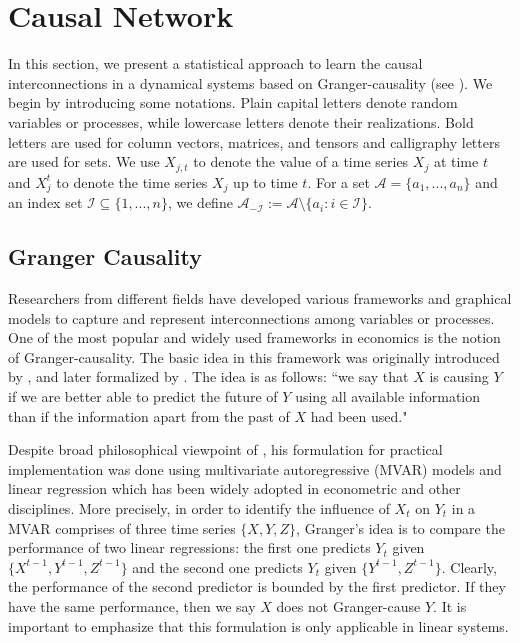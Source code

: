 

\section{Causal Network}\label{Sec1}

In this section, we present a statistical approach to learn the causal interconnections in a dynamical systems based on Granger-causality (see \citet{granger}). 
We begin by introducing some notations.
Plain capital letters denote random variables or processes, while lowercase letters denote their realizations. 
Bold letters are used for column vectors, matrices, and tensors and calligraphy letters are used for sets. 
We use $X_{j,t}$ to denote the value of a time series $X_j$ at time $t$ 
and $X^{t}_j$ to denote the time series $X_j$ up to time $t$. 
For a set $\mathcal{A}=\{a_1,...,a_n\}$ and an index set $\mathcal{I}\subseteq\{1,...,n\}$, we define $\mathcal{A}_{-\mathcal{I}}:=\mathcal{A}\setminus\{a_i: i\in\mathcal{I}\}$. 



\subsection{Granger Causality}\label{sec:granger}

Researchers from different fields have developed various frameworks and graphical models to capture and represent interconnections among variables or processes.
One of the most popular and widely used frameworks in economics is the notion of Granger-causality.
The basic idea in this framework was originally introduced by \citet{wiener1956theory}, and later formalized by \citet{granger}. 
The idea is as follows: ``we say that $X$ is causing $Y$ if we are better able to predict the future of $Y$ using all available information than if the information apart from the past of $X$ had been used."

Despite broad philosophical viewpoint of \citet{granger1963economic}, his formulation for practical implementation was done using multivariate autoregressive (MVAR) models and linear regression which has been widely adopted in econometric and other disciplines.
More precisely, in order to identify the influence of $X_t$ on $Y_t$ in a MVAR comprises of three time series $\{X,Y,Z\}$, Granger's idea is to compare the performance of two linear regressions: the first one predicts $Y_t$ given $\{X^{t-1},Y^{t-1},Z^{t-1}\}$ and the second one predicts $Y_t$ given $\{Y^{t-1},Z^{t-1}\}$. Clearly, the performance of the second predictor is bounded by the first predictor. If they have the same performance, then we say $X$ does not Granger-cause $Y$. It is important to emphasize that this formulation is only applicable in linear systems. 

